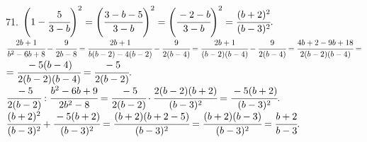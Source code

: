 71. $\left(1-\cfrac{5}{3-b}\right)^2=\left(\cfrac{3-b-5}{3-b}\right)^2=\left(\cfrac{-2-b}{3-b}\right)^2=\cfrac{(b+2)^2}{(b-3)^2}.$\\
$\cfrac{2b+1}{b^2-6b+8}-\cfrac{9}{2b-8}=\cfrac{2b+1}{b(b-2)-4(b-2)}-\cfrac{9}{2(b-4)}=\cfrac{2b+1}{(b-2)(b-4)}-\cfrac{9}{2(b-4)}=
\cfrac{4b+2-9b+18}{2(b-2)(b-4)}=$\\$=\cfrac{-5(b-4)}{2(b-2)(b-4)}=\cfrac{-5}{2(b-2)}.$\\
$\cfrac{-5}{2(b-2)}:\cfrac{b^2-6b+9}{2b^2-8}=\cfrac{-5}{2(b-2)}\cdot\cfrac{2(b-2)(b+2)}{(b-3)^2}=\cfrac{-5(b+2)}{(b-3)^2}.$\\
$\cfrac{(b+2)^2}{(b-3)^2}+\cfrac{-5(b+2)}{(b-3)^2}=\cfrac{(b+2)(b+2-5)}{(b-3)^2}=\cfrac{(b+2)(b-3)}{(b-3)^2}=\cfrac{b+2}{b-3}.$\\
